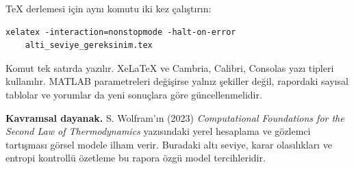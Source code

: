 \documentclass[11pt,a4paper]{article}
\begin{document}
TeX derlemesi için aynı komutu iki kez çalıştırın:
\begin{verbatim}
xelatex -interaction=nonstopmode -halt-on-error
    alti_seviye_gereksinim.tex
\end{verbatim}
Komut tek satırda yazılır. XeLaTeX ve Cambria, Calibri, Consolas yazı tipleri
kullanılır. MATLAB parametreleri değişirse yalnız şekiller değil, rapordaki
sayısal tablolar ve yorumlar da yeni sonuçlara göre güncellenmelidir.

\textbf{Kavramsal dayanak.} S. Wolfram'ın (2023) \emph{Computational
Foundations for the Second Law of Thermodynamics} yazısındaki yerel hesaplama
ve gözlemci tartışması görsel modele ilham verir. Buradaki altı seviye,
karar olasılıkları ve entropi kontrollü özetleme bu rapora özgü model tercihleridir.
\end{document}
